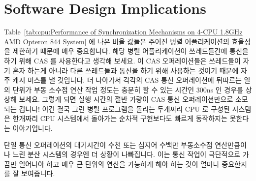 
\section{Software Design Implications}
\label{sec:cpu:Software Design Implications}

Table~\ref{tab:cpu:Performance of Synchronization Mechanisms on 4-CPU 1.8GHz
AMD Opteron 844 System} 에 나온 비율 값들은 주어진 병렬 어플리케이션의 효율성을
제한하기 때문에 매우 중요합니다.
해당 병렬 어플리케이션이 쓰레드들간에 통신을 하기 위해 CAS 를 사용한다고 생각해
보세요.
이 CAS 오퍼레이션들은 쓰레드들이 자기 혼자 하는게 아니라 다른 쓰레드들과 통신을
하기 위해 사용하는 것이기 때문에 자주 캐시 미스를 낼 것입니다.
더 나아가서 각각의 CAS 통신 오퍼레이션에 뒤따르는 일의 단위가 부동 소수점 연산
작업 정도는 충분히 할 수 있는 시간인 300ns 인 경우를 상상해 보세요.
그렇게 되면 실행 시간의 절반 가량이 CAS 통신 오퍼레이션만으로 소모되는 겁니다!
이건 결국 그런 병렬 프로그램을 돌리는 두개짜리 CPU 로 구성된 시스템은 한개짜리
CPU 시스템에서 돌아가는 순차적 구현보다도 빠르게 동작하지는 못한다는
이야기입니다.

단일 통신 오퍼레이션의 대기시간이 수천 또는 심지어 수백만 부동소수점
연산만큼이나 느린 분산 시스템의 경우엔 더 상황이 나빠집니다.
이는 통신 작업이 극단적으로 가끔만 일어나야 하고 매우 큰 단위의 연산을 가능하게
해야 하는 것이 얼마나 중요한지를 잘 보여줍니다.

\iffalse
The values of the ratios in
Table~\ref{tab:cpu:Performance of Synchronization Mechanisms on 4-CPU 1.8GHz AMD Opteron 844 System}
are critically important, as they limit the
efficiency of a given parallel application.
To see this, suppose that the parallel application uses CAS
operations to communicate among threads.
These CAS operations will typically involve a cache miss, that is, assuming
that the threads are communicating primarily with each other rather than
with themselves.
Suppose further that the unit of work corresponding to each CAS communication
operation takes 300ns, which is sufficient time to compute several
floating-point transcendental functions.
Then about half of the execution time will be consumed by the CAS
communication operations!
This in turn means that a two-CPU system running such a parallel program
would run no faster than a sequential implementation running on a
single CPU.

The situation is even worse in the distributed-system case, where the
latency of a single communications operation might take as long as
thousands or even millions of floating-point operations.
This illustrates how important it is for communications operations to
be extremely infrequent and to enable very large quantities of processing.
\fi

